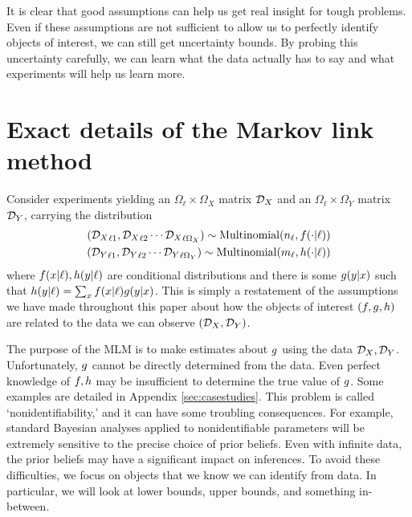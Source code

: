 It is clear that good assumptions can help us get real insight for tough problems. Even if these assumptions are not sufficient to allow us to perfectly identify objects of interest, we can still get uncertainty bounds.  By probing this uncertainty carefully, we can learn what the data actually has to say and what experiments will help us learn more.




\appendix


%

\section{Exact details of the Markov link method}

\label{sec:mlmdetails}
 
Consider experiments yielding an $\Omega_\ell\times\Omega_X$ matrix ${\mathcal{D}_X}$ and an $\Omega_\ell \times \Omega_Y$ matrix ${\mathcal{D}_Y}$, carrying the distribution
\begin{align*}
({\mathcal{D}_X}_{\ell 1},{\mathcal{D}_X}_{\ell 2}\cdots {\mathcal{D}_X}_{\ell \Omega_X}) \sim \mathrm{Multinomial}(n_\ell,f(\cdot | \ell))\\
({\mathcal{D}_Y}_{\ell 1},{\mathcal{D}_Y}_{\ell 2}\cdots {\mathcal{D}_Y}_{\ell \Omega_Y}) \sim \mathrm{Multinomial}(m_\ell,h(\cdot | \ell))
\end{align*}
where $f(x|\ell),h(y|\ell)$ are conditional distributions and there is some $g(y|x)$ such that $h(y|\ell)=\sum_x f(x|\ell)g(y|x)$.  This is simply a restatement of the assumptions we have made throughout this paper about how the objects of interest $(f,g,h)$ are related to the data we can observe $({\mathcal{D}_X},{\mathcal{D}_Y})$.

The purpose of the MLM is to make estimates about $g$ using the data ${\mathcal{D}_X},{\mathcal{D}_Y}$.  Unfortunately, $g$ cannot be directly determined from the data.  Even perfect knowledge of $f,h$ may be insufficient to determine the true value of $g$.  Some examples are detailed in Appendix \ref{sec:casestudies}.  This problem is called `nonidentifiability,' and it can have some troubling consequences.  For example, standard Bayesian analyses applied to nonidentifiable parameters will be extremely sensitive to the precise choice of prior beliefs.  Even with infinite data, the prior beliefs may have a significant impact on inferences.  To avoid these difficulties, we focus on objects that we know we can identify from data.  In particular, we will look at lower bounds, upper bounds, and something in-between.

